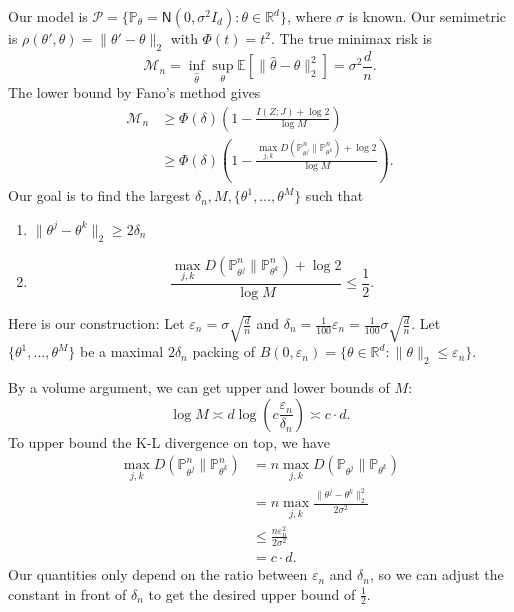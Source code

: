 \begin{exam}
    Our model is $\mathcal{P} = \{\mathbb{P}_\theta = \mathsf{N}(0, \sigma^2 I_d) : \theta \in \mathbb{R}^d\}$, where $\sigma$ is known. Our semimetric is $\rho(\theta', \theta) = \|\theta' - \theta\|_2$ with $\Phi(t) = t^2$. The true minimax risk is
    \begin{equation*}
        \mathcal{M}_n = \inf_{\widehat{\theta}} \sup_{\theta} \mathbb{E}[\|\widehat{\theta} - \theta\|_2^2] = \sigma^2 \frac{d}{n}.
    \end{equation*}
    The lower bound by Fano's method gives
    \begin{align*}
        \mathcal{M}_n &\geq \Phi(\delta) \left( 1 - \frac{I(Z;J) + \log 2}{\log M} \right) \\
        &\geq \Phi(\delta) \left( 1 - \frac{\max_{j,k} D(\mathbb{P}_{\theta^j}^n \| \mathbb{P}_{\theta^k}^n) + \log 2}{\log M} \right).
    \end{align*}
    Our goal is to find the largest $\delta_n, M, \{\theta^1, \ldots, \theta^M\}$ such that
    \begin{enumerate}
        \item[(a)] $\|\theta^j - \theta^k\|_2 \geq 2\delta_n$
        \item[(b)] \begin{equation*}
            \frac{\max_{j,k} D(\mathbb{P}_{\theta^j}^n \| \mathbb{P}_{\theta^k}^n) + \log 2}{\log M} \leq \frac{1}{2}.
        \end{equation*}
    \end{enumerate}

    Here is our construction: Let $\varepsilon_n = \sigma \sqrt{\frac{d}{n}}$ and $\delta_n = \frac{1}{100} \varepsilon_n = \frac{1}{100} \sigma \sqrt{\frac{d}{n}}$. Let $\{\theta^1, \ldots, \theta^M\}$ be a maximal $2\delta_n$ packing of $B(0, \varepsilon_n) = \{\theta \in \mathbb{R}^d : \|\theta\|_2 \leq \varepsilon_n\}$.

    By a volume argument, we can get upper and lower bounds of $M$:
    \begin{equation*}
        \log M \asymp d \log\left( c \frac{\varepsilon_n}{\delta_n} \right) \asymp c \cdot d.
    \end{equation*}
    To upper bound the K-L divergence on top, we have
    \begin{align*}
        \max_{j,k} D(\mathbb{P}_{\theta^j}^n \| \mathbb{P}_{\theta^k}^n)
        &= n \max_{j,k} D(\mathbb{P}_{\theta^j} \| \mathbb{P}_{\theta^k}) \\
        &= n \max_{j,k} \frac{\|\theta^j - \theta^k\|_2^2}{2\sigma^2} \\
        &\leq \frac{n \varepsilon_n^2}{2\sigma^2} \\
        &= c \cdot d.
    \end{align*}
    Our quantities only depend on the ratio between $\varepsilon_n$ and $\delta_n$, so we can adjust the constant in front of $\delta_n$ to get the desired upper bound of $\frac{1}{2}$.


\end{exam}

